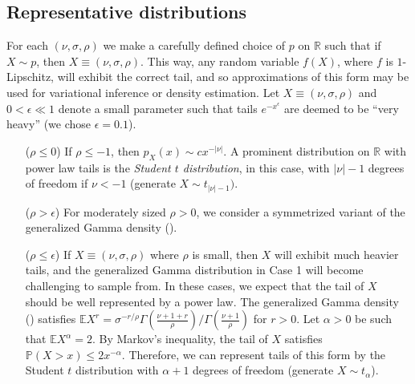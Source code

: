 \documentclass[../thesis.tex]{subfiles}
\begin{document}
\subsection{Representative distributions}\label{ssec:repr_dist}

For each $(\nu,\sigma,\rho)$ we make a carefully defined choice of $p$ on $\mathbb{R}$ such that if $X \sim p$, then $X \equiv (\nu,\sigma,\rho)$. This way, any random variable $f(X)$, where $f$ is $1$-Lipschitz, will exhibit the correct tail, and so approximations of this form may be used for variational inference or density estimation. Let $X \equiv (\nu,\sigma,\rho)$ and $0 < \epsilon \ll 1$ denote a small parameter such that tails $e^{-x^\epsilon}$ are deemed to be ``very heavy'' (we chose $\epsilon = 0.1$). %

\begin{itemize}
  \item[($\rho \leq 0$)] If $\rho \leq -1$, then $p_X(x) \sim c x^{-|\nu|}$. A prominent distribution on $\mathbb{R}$ with power law tails is the \emph{Student $t$ distribution}, in this case, with $|\nu|-1$ degrees of freedom if $\nu < -1$ (generate $X \sim t_{|\nu|-1})$.
  \item[($\rho > \epsilon$)] For moderately sized $\rho > 0$, we consider a symmetrized variant of the generalized Gamma density ().
  \item[($\rho \leq \epsilon$)] If $X \equiv (\nu,\sigma,\rho)$ where $\rho$ is small, then $X$ will exhibit much heavier tails, and the generalized Gamma distribution in Case 1 will become challenging to sample from. In these cases, we expect that the tail of $X$ should be well represented by a power law.
    The generalized Gamma density () satisfies $\mathbb{E}X^r = \sigma^{-r/\rho} \Gamma(\frac{\nu+1+r}{\rho})/\Gamma(\frac{\nu+1}{\rho})$ for $r > 0$. Let $\alpha > 0$ be such that $\mathbb{E}X^\alpha = 2$. By Markov's inequality, the tail of $X$ satisfies $\mathbb{P}(X>x)\leq 2 x^{-\alpha}$. Therefore, we can represent tails of this form by the Student $t$ distribution with $\alpha+1$ degrees of freedom (generate $X \sim t_{\alpha}$).
\end{itemize}
\end{document}
